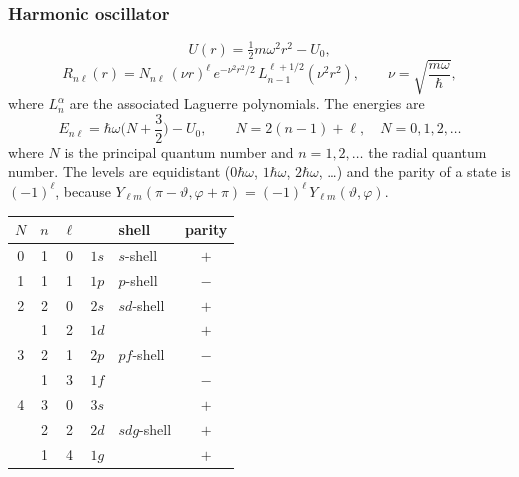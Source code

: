 \documentclass[11pt,a4paper]{article}
\begin{document}
\subsubsection*{Harmonic oscillator}
\[
U(r)=\tfrac12 m\omega^2r^2-U_0 ,
\]
\[
R_{n\ell}(r)=N_{n\ell}\,(\nu r)^\ell\,e^{-\nu^2r^2/2}\,L_{n-1}^{\ell+1/2}(\nu^2r^2),
\qquad \nu=\sqrt{\frac{m\omega}{\hbar}},
\]
where $L_{n}^{\alpha}$ are the associated Laguerre polynomials. The energies are
\[
E_{n\ell}=\hbar\omega\Big(N+\frac32\Big)-U_0,
\qquad N=2(n-1)+\ell,\quad N=0,1,2,\dots
\]
where $N$ is the principal quantum number and $n=1,2,\dots$ the radial quantum number. The levels are equidistant ($0\hbar\omega$, $1\hbar\omega$, $2\hbar\omega$, \dots) and the parity of a state is $(-1)^\ell$, because
$Y_{\ell m}(\pi-\vartheta,\varphi+\pi)=(-1)^\ell\,Y_{\ell m}(\vartheta,\varphi)$.
\begin{center}
\begin{tabular}{c c c c l c}
$N$ & $n$ & $\ell$ & & shell & parity \\ \hline
0 & 1 & 0 & $1s$ & $s$-shell & $+$ \\ \hline
1 & 1 & 1 & $1p$ & $p$-shell & $-$ \\ \hline
2 & 2 & 0 & $2s$ & $sd$-shell & $+$ \\
  & 1 & 2 & $1d$ &  & $+$ \\ \hline
3 & 2 & 1 & $2p$ & $pf$-shell & $-$ \\
  & 1 & 3 & $1f$ &  & $-$ \\ \hline
4 & 3 & 0 & $3s$ & & $+$ \\
  & 2 & 2 & $2d$ & $sdg$-shell & $+$ \\
  & 1 & 4 & $1g$ & & $+$ \\ \hline
\end{tabular}
\end{center}

\end{document}
